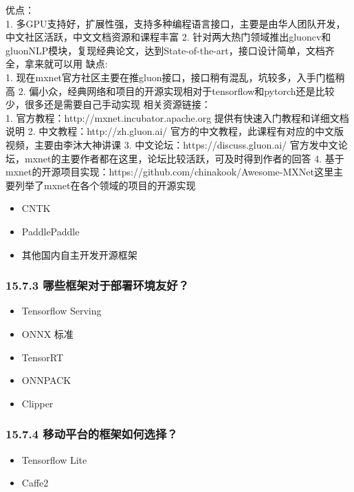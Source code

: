 优点：\\
1.
多GPU支持好，扩展性强，支持多种编程语言接口，主要是由华人团队开发，中文社区活跃，中文文档资源和课程丰富
2.
针对两大热门领域推出gluoncv和gluonNLP模块，复现经典论文，达到State-of-the-art，接口设计简单，文档齐全，拿来就可以用
缺点:\\
1.
现在mxnet官方社区主要在推gluon接口，接口稍有混乱，坑较多，入手门槛稍高
2.
偏小众，经典网络和项目的开源实现相对于tensorflow和pytorch还是比较少，很多还是需要自己手动实现
相关资源链接：\\
1. 官方教程：http://mxnet.incubator.apache.org
提供有快速入门教程和详细文档说明 2. 中文教程：http://zh.gluon.ai/
官方的中文教程，此课程有对应的中文版视频，主要由李沐大神讲课 3.
中文论坛：https://discuss.gluon.ai/
官方发中文论坛，mxnet的主要作者都在这里，论坛比较活跃，可及时得到作者的回答
4.
基于mxnet的开源项目实现：https://github.com/chinakook/Awesome-MXNet这里主要列举了mxnet在各个领域的项目的开源实现

\begin{itemize}
\item
  CNTK
\item
  PaddlePaddle
\item
  其他国内自主开发开源框架
\end{itemize}

\subsubsection{15.7.3
哪些框架对于部署环境友好？}\label{ux54eaux4e9bux6846ux67b6ux5bf9ux4e8eux90e8ux7f72ux73afux5883ux53cbux597d}

\begin{itemize}
\item
  Tensorflow Serving
\item
  ONNX 标准
\item
  TensorRT
\item
  ONNPACK
\item
  Clipper
\end{itemize}

\subsubsection{15.7.4
移动平台的框架如何选择？}\label{ux79fbux52a8ux5e73ux53f0ux7684ux6846ux67b6ux5982ux4f55ux9009ux62e9}

\begin{itemize}
\item
  Tensorflow Lite
\item
  Caffe2
\end{itemize}


